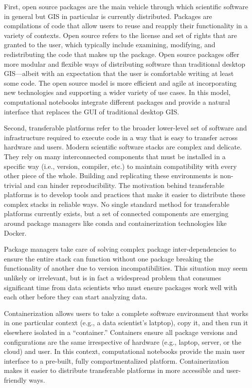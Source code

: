 \documentclass[11pt,letterpaper]{article}
\begin{document}
First, open source packages are the main vehicle through which scientific software in general but GIS in particular is currently distributed. Packages are compilations of code that allow users to reuse and reapply their functionality in a variety of contexts. Open source refers to the license and set of rights that are granted to the user, which typically include examining, modifying, and redistributing the code that makes up the package. Open source packages offer more modular and flexible ways of distributing software than traditional desktop GIS---albeit with an expectation that the user is comfortable writing at least some code. The open source model is more efficient and agile at incorporating new technologies and supporting a wider variety of use cases. In this model, computational notebooks integrate different packages and provide a natural interface that replaces the GUI of traditional desktop GIS.

Second, transferable platforms refer to the broader lower-level set of software and infrastructure required to execute code in a way that is easy to transfer across hardware and users. Modern scientific software stacks are complex and delicate. They rely on many interconnected components that must be installed in a specific way (i.e., version, compiler, etc.) to maintain compatibility with every other piece of the whole. Building and replicating these environments is non-trivial and can hinder reproducibility. The motivation behind transferable platforms is to develop tools and practices that make it easier to distribute these complex stacks in reliable ways. No single standard method for transferable platforms currently exists, but a set of connected components are emerging around package managers like conda and containerization technologies like Docker.

Package managers take care of solving complex package inter-dependencies to ensure the entire stack can function without one package breaking the functionality of another due to version incompatibilities. This situation may seem unlikely or irrelevant, but is in fact a widespread problem that consumes significant time from data scientists who must ensure packages work well with each other before they can start analyzing data.

Containerization allows users to take a complete software environment that works in one particular context (e.g., a data scientist's latptop), copy it, and then run it elsewhere isolated in a \enquote{container.} Containers ensure all package versions and configurations are the same irrespective of hardware (e.g., laptop, server, or the cloud) and user. In this context, computational notebooks provide the main user interface to a pre-built, fully compartmentalized platform. Containerization makes it easier to distribute transferable platforms in more accessible and user-friendly ways.
\end{document}
